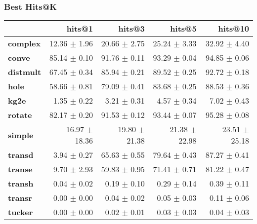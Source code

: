 \documentclass{article}
\begin{document}
    \subsubsection{Best Hits@K}
    \begin{center}
    \begin{tabular}{lrrrr}
\toprule
{} &         hits@1 &         hits@3 &         hits@5 &        hits@10 \\
\midrule
\textbf{complex } &   12.36 $\pm$ 1.96 &   20.66 $\pm$ 2.75 &   25.24 $\pm$ 3.33 &   32.92 $\pm$ 4.40 \\
\textbf{conve   } &   85.14 $\pm$ 0.10 &   91.76 $\pm$ 0.11 &   93.29 $\pm$ 0.04 &   94.85 $\pm$ 0.06 \\
\textbf{distmult} &   67.45 $\pm$ 0.34 &   85.94 $\pm$ 0.21 &   89.52 $\pm$ 0.25 &   92.72 $\pm$ 0.18 \\
\textbf{hole    } &   58.66 $\pm$ 0.81 &   79.09 $\pm$ 0.41 &   83.68 $\pm$ 0.25 &   88.53 $\pm$ 0.36 \\
\textbf{kg2e    } &    1.35 $\pm$ 0.22 &    3.21 $\pm$ 0.31 &    4.57 $\pm$ 0.34 &    7.02 $\pm$ 0.43 \\
\textbf{rotate  } &   82.17 $\pm$ 0.20 &   91.53 $\pm$ 0.12 &   93.44 $\pm$ 0.07 &   95.28 $\pm$ 0.08 \\
\textbf{simple  } &  16.97 $\pm$ 18.36 &  19.80 $\pm$ 21.38 &  21.38 $\pm$ 22.98 &  23.51 $\pm$ 25.18 \\
\textbf{transd  } &    3.94 $\pm$ 0.27 &   65.63 $\pm$ 0.55 &   79.64 $\pm$ 0.43 &   87.27 $\pm$ 0.41 \\
\textbf{transe  } &    9.70 $\pm$ 2.93 &   59.83 $\pm$ 0.95 &   71.41 $\pm$ 0.71 &   81.22 $\pm$ 0.47 \\
\textbf{transh  } &    0.04 $\pm$ 0.02 &    0.19 $\pm$ 0.10 &    0.29 $\pm$ 0.14 &    0.39 $\pm$ 0.11 \\
\textbf{transr  } &    0.00 $\pm$ 0.00 &    0.04 $\pm$ 0.02 &    0.05 $\pm$ 0.03 &    0.11 $\pm$ 0.06 \\
\textbf{tucker  } &    0.00 $\pm$ 0.00 &    0.02 $\pm$ 0.01 &    0.03 $\pm$ 0.03 &    0.04 $\pm$ 0.03 \\
\bottomrule
\end{tabular}

    \end{center}
\end{document}
